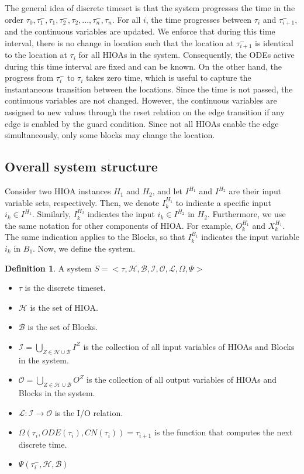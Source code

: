 \documentclass[twoside,a4paper,12pt]{article}
\theoremstyle{definition}
\newtheorem{definition}{Definition}
\begin{document}
The general idea of discrete timeset is that the system progresses the time in the order $\tau_0, \tau_1^-, \tau_1, \tau_2^-, \tau_2, ... , \tau_n^-, \tau_n$. For all $i$, the time progresses between $\tau_i$ and $\tau_{i+1}^-$, and the continuous variables are updated. We enforce that during this time interval, there is no change in location such that the location at $\tau_{i+1}^-$ is identical to the location at $\tau_i$ for all HIOAs in the system.
Consequently, the ODEs active during this time interval are fixed and can be known.
On the other hand, the progress from $\tau_{i}^-$ to $\tau_{i}$ takes zero time, which is useful to capture the instantaneous transition between the locations.
Since the time is not passed, the continuous variables are not changed. 
However, the continuous variables are assigned to new values through the reset relation on the edge transition if any edge is enabled by the guard condition.
Since not all HIOAs enable the edge simultaneously, only some blocks may change the location.

\subsection{Overall system structure}
Consider two HIOA instances $H_1$ and $H_2$, and let $I^{H_1}$ and $I^{H_2}$ are their input variable sets, respectively.
Then, we denote $I^{H_1}_k$ to indicate a specific input $i_k \in I^{H_1}$. Similarly, $I^{H_2}_k$ indicates the input $i_k \in I^{H_2}$ in $H_2$.
Furthermore, we use the same notation for other components of HIOA. 
For example, $O^{H_1}_k$ and $X^{H_1}_k$.
The same indication applies to the Blocks, so that $I^{B_1}_k$ indicates the input variable $i_k$ in $B_1$.
Now, we define the system.
\begin{definition}
	A system $S = <\tau, \mathcal{H}, \mathcal{B}, \mathcal{I}, \mathcal{O}, \mathcal{L}, \Omega, \Psi>$
	\begin{itemize}
		\item $\tau$ is the discrete timeset.
		\item $\mathcal{H}$ is the set of HIOA.
		\item $\mathcal{B}$ is the set of Blocks.
		\item $\mathcal{I} = \bigcup\limits_{Z\in\mathcal{H} \cup \mathcal{B}}I^Z$ is the collection of all input variables of HIOAs and Blocks in the system.
		\item $\mathcal{O} = \bigcup\limits_{Z\in\mathcal{H} \cup \mathcal{B}}O^Z$ is the collection of all output variables of HIOAs and Blocks in the system.
		\item $\mathcal{L} : \mathcal{I} \rightarrow \mathcal{O}$ is the I/O relation. 
		\item $\Omega(\tau_i, ODE(\tau_i), CN(\tau_i)) = \tau_{i+1}$ is the function that computes the next discrete time.
		\item $\Psi(\tau_i^-, \mathcal{H}, \mathcal{B}) $
	\end{itemize}
\end{definition}
\end{document}
